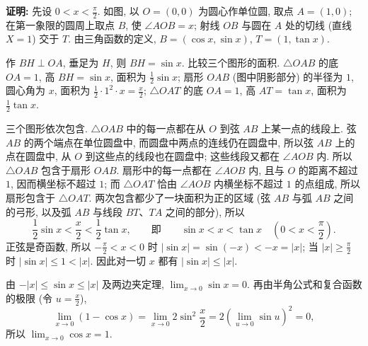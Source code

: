 \documentclass[UTF8,openany]{ctexbook}
\theoremstyle{chinesetextbook}
\newenvironment{cnproof}{\par\indent\textbf{证明:} \ignorespaces}{\par}
\begin{document}
\begin{cnproof}
先设 $\displaystyle0<x<\frac\pi2$. 如图, 以 $O=(0,0)$ 为圆心作单位圆, 取点 $A=(1,0)$; 在第一象限的圆周上取点 $B$, 使 $\angle AOB=x$; 射线 $OB$ 与圆在 $A$ 处的切线 (直线 $X=1$) 交于 $T$. 由三角函数的定义, $B=(\cos x,\sin x)$, $T=(1,\tan x)$.
\begin{center}
\end{center}
作 $BH\perp OA$, 垂足为 $H$, 则 $BH=\sin x$. 比较三个图形的面积. $\triangle OAB$ 的底 $OA=1$, 高 $BH=\sin x$, 面积为 $\displaystyle\frac12\sin x$; 扇形 $OAB$ (图中阴影部分) 的半径为 $1$, 圆心角为 $x$, 面积为 $\displaystyle\frac12\cdot1^2\cdot x=\frac x2$; $\triangle OAT$ 的底 $OA=1$, 高 $AT=\tan x$, 面积为 $\displaystyle\frac12\tan x$.

三个图形依次包含. $\triangle OAB$ 中的每一点都在从 $O$ 到弦 $AB$ 上某一点的线段上. 弦 $AB$ 的两个端点在单位圆盘中, 而圆盘中两点的连线仍在圆盘中, 所以弦 $AB$ 上的点在圆盘中, 从 $O$ 到这些点的线段也在圆盘中; 这些线段又都在 $\angle AOB$ 内. 所以 $\triangle OAB$ 包含于扇形 $OAB$. 扇形中的每一点都在 $\angle AOB$ 内, 且与 $O$ 的距离不超过 $1$, 因而横坐标不超过 $1$; 而 $\triangle OAT$ 恰由 $\angle AOB$ 内横坐标不超过 $1$ 的点组成, 所以扇形包含于 $\triangle OAT$. 两次包含都少了一块面积为正的区域 (弦 $AB$ 与弧 $AB$ 之间的弓形, 以及弧 $AB$ 与线段 $BT$、$TA$ 之间的部分), 所以
\[
\frac12\sin x<\frac x2<\frac12\tan x,\qquad\text{即}\qquad\sin x<x<\tan x\quad\left(0<x<\frac\pi2\right).
\]
正弦是奇函数, 所以 $\displaystyle-\frac\pi2<x<0$ 时 $|\sin x|=\sin(-x)<-x=|x|$; 当 $\displaystyle|x|\ge\frac\pi2$ 时 $|\sin x|\le1<|x|$. 因此对一切 $x$ 都有 $|\sin x|\le|x|$.

由 $-|x|\le\sin x\le|x|$ 及两边夹定理, $\displaystyle\lim_{x\to0}\sin x=0$. 再由半角公式和复合函数的极限 (令 $\displaystyle u=\frac x2$),
\[
\lim_{x\to0}(1-\cos x)=\lim_{x\to0}2\sin^2\frac x2=2\left(\lim_{u\to0}\sin u\right)^2=0,
\]
所以 $\displaystyle\lim_{x\to0}\cos x=1$.
\end{cnproof}
\end{document}
